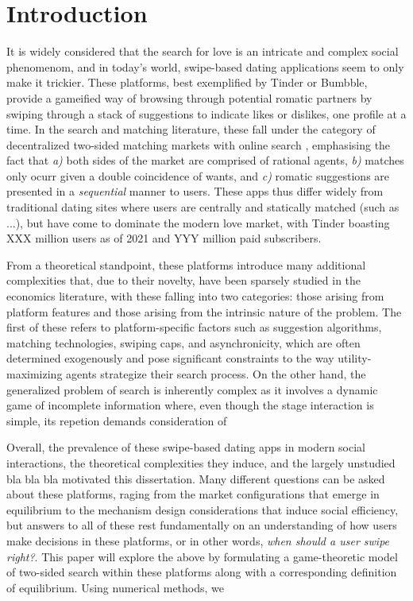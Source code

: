 \section{Introduction}
\label{sec:Introduction} 

It is widely considered that the search for love is an intricate and complex social phenomenom, and in today's world, swipe-based dating applications seem to only make it trickier. 
These platforms, best exemplified by Tinder or Bumbble, provide a gameified way of browsing through potential romatic partners by swiping through a stack of suggestions to indicate likes or dislikes, one profile at a time. 
In the search and matching literature, these fall under the category of decentralized two-sided matching markets with online search \citep{kanoria2021facilitating}, emphasising the fact that \textit{a)} both sides of the market are comprised of rational agents, \textit{b)} matches only ocurr given a double coincidence of wants, and \textit{c)} romatic suggestions are presented in a \textit{sequential} manner to users. 
These apps thus differ widely from traditional dating sites where users are centrally and statically matched (such as ...), but have come to dominate the modern love market, with Tinder boasting XXX million users as of 2021 and YYY million paid subscribers.


From a theoretical standpoint, these platforms introduce many additional complexities that, due to their novelty, have been sparsely studied in the economics literature, with these falling into two categories: those arising from platform features and those arising from the intrinsic nature of the problem. 
The first of these refers to platform-specific factors such as suggestion algorithms, matching technologies, swiping caps, and asynchronicity, which are often determined exogenously and pose significant constraints to the way utility-maximizing agents strategize their search process. 
On the other hand, the generalized problem of search is inherently complex as it involves a dynamic game of incomplete information where, even though the stage interaction is simple, its repetion demands consideration of 

Overall, the prevalence of these swipe-based dating apps in modern social interactions, the theoretical complexities they induce, and the largely unstudied bla bla bla motivated this dissertation. Many different questions can be asked about these platforms, raging from the market configurations that emerge in equilibrium to the mechanism design considerations that induce social efficiency, but answers to all of these rest fundamentally on an understanding of how users make decisions in these platforms, or in other words, \textit{when should a user swipe right?}. This paper will explore the above by formulating a game-theoretic model of two-sided search within these platforms along with a corresponding definition of equilibrium. Using numerical methods, we 



